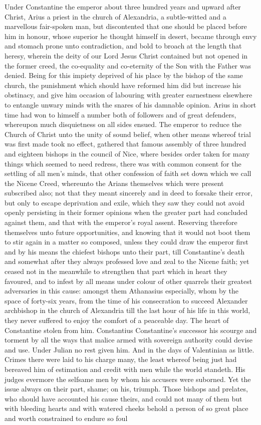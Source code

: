 Under Constantine the emperor about three hundred years and upward after Christ, Arius a priest in the church of Alexandria, a subtle-witted and a marvellous fair-spoken man,  but discontented that one should be placed before him in honour, whose superior he thought himself in desert, became through envy and stomach prone unto contradiction, and bold to broach at the length that heresy, wherein the deity of our Lord Jesus Christ contained but not opened in the former creed, the co-equality and co-eternity of the Son with the Father was denied. Being for this impiety deprived of his place by the bishop of the same church, the punishment which should have reformed him did but increase his obstinacy, and give him occasion of labouring with greater earnestness elsewhere to entangle unwary minds with the snares of his damnable opinion. Arius in short time had won to himself a number both of followers and of great defenders, whereupon much disquietness on all sides ensued. The emperor to reduce the Church of Christ unto the unity of sound belief, when other means whereof trial was first made took no effect, gathered that famous assembly of three hundred and eighteen bishops in the council of Nice, where besides order taken for many things which seemed to need redress, there was with common consent for the settling of all men’s minds, that other confession of faith set down which we call the Nicene Creed, whereunto the Arians themselves which were present subscribed also; not that they meant sincerely and in deed to forsake their error, but only to escape deprivation and exile, which they saw they could not avoid openly persisting in their former opinions when the greater part had concluded against them, and that with the emperor’s royal assent. Reserving therefore themselves unto future opportunities, and knowing that it would not boot them to stir again in a matter so composed, unless they could draw the emperor first and by his means the chiefest bishops unto their part, till Constantine’s death and somewhat after they always professed love and zeal to the Nicene faith; yet ceased not in the meanwhile to strengthen that part which in heart they favoured, and to infest by all means under colour of other quarrels their greatest adversaries in this cause: amongst them Athanasius especially, whom by the space of forty-six years, from the time of his consecration to succeed Alexander archbishop in the church of Alexandria till the last hour of his life in this world, they never suffered to enjoy the comfort of a peaceable  day. The heart of Constantine stolen from him. Constantius Constantine’s successor his scourge and torment by all the ways that malice armed with sovereign authority could devise and use. Under Julian no rest given him. And in the days of Valentinian as little. Crimes there were laid to his charge many, the least whereof being just had bereaved him of estimation and credit with men while the world standeth. His judges evermore the selfsame men by whom his accusers were suborned. Yet the issue always on their part, shame; on his, triumph. Those bishops and prelates, who should have accounted his cause theirs, and could not many of them but with bleeding hearts and with watered cheeks behold a person of so great place and worth constrained to endure so foul 